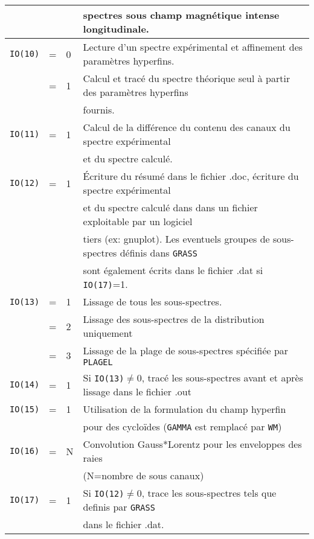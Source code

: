 \begin{table}
\begin{tabular}{|rcl|l|}
                  & &   &spectres sous champ magnétique intense longitudinale.\\
\hline  
\lstinline{IO(10)}&=& 0 & Lecture d'un spectre expérimental et affinement des paramètres hyperfins. \\
                  &=& 1 & Calcul et tracé du spectre théorique seul à partir des paramètres hyperfins\\
                  & &   & fournis. \\
\hline  
\lstinline{IO(11)}&=& 1 & Calcul de la différence du contenu des canaux du spectre expérimental\\
                  & &  & et du spectre calculé.\\
\hline  
\lstinline{IO(12)}&=& 1 & \'Ecriture du résumé dans le fichier .doc, écriture du spectre expérimental\\
                  & &   & et du spectre calculé dans dans un fichier exploitable par un logiciel\\
                  & &   &  tiers (ex: gnuplot). Les eventuels groupes de sous-spectres définis dans \lstinline{GRASS}\\
                  & &   &  sont également écrits dans le fichier .dat si \lstinline{IO(17)}=1.\\
\hline  
\lstinline{IO(13)}&=& 1 & Lissage de tous les sous-spectres. \\
                  &=& 2 & Lissage des sous-spectres de la distribution uniquement \\
                  &=& 3 & Lissage de la plage de sous-spectres spécifiée par \lstinline{PLAGEL} \\
\hline  
\lstinline{IO(14)}&=& 1 & Si \lstinline{IO(13)}$\neq$0, tracé les sous-spectres avant et après lissage dans le fichier .out \\
\hline  
\lstinline{IO(15)}&=& 1 & Utilisation de la formulation du champ hyperfin \\
                  & &   & pour des cycloïdes (\lstinline{GAMMA} est remplacé par \lstinline{WM})\\
\hline
\lstinline{IO(16)}&=& N & Convolution Gauss*Lorentz pour les enveloppes des raies\\
                  & &  & (N=nombre de sous canaux)\\
\hline  
\lstinline{IO(17)}&=& 1 & Si \lstinline{IO(12)}$\neq$0, trace les sous-spectres tels que definis par \lstinline{GRASS}\\
                  & &   & dans le fichier .dat. \\

\end{tabular}
\end{table}
